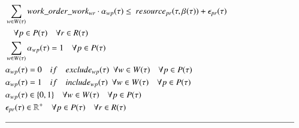 \begin{alignat}{2}
	& \sum_{\ElementWorkOrder \in \SetWorkOrder{}} \ParStrategicWorkOrderWeight \cdot \VarStrategicWorkOrderAssignment{\ElementWorkOrder}{\ElementPeriod} \leq \ \ParStrategicResource + \VarStrategicExcess  \notag\\
	& \quad \forall \ElementPeriod \in \SetPeriod \quad \forall \ElementResource \in \SetResource                                \label{eqn:strategic:constraint:resource}\\
	& \sum_{\ElementWorkOrder \in \SetWorkOrder{}} \VarStrategicWorkOrderAssignment{\ElementWorkOrder}{\ElementPeriod} = 1              \quad \forall \ElementPeriod \in \SetPeriod                                                                                                                                                                                                                               \label{eqn:constraint:strategic:schedule_once}\\
	& \VarStrategicWorkOrderAssignment{\ElementWorkOrder}{\ElementPeriod} = 0                                                            \quad if\quad \ParStrategicExclude \ \ \forall \ElementWorkOrder \in \SetWorkOrder{}\quad \forall \ElementPeriod \in \SetPeriod                                                                                                                                                                                              \label{eqn:constraint:strategic:include}\\
	& \VarStrategicWorkOrderAssignment{\ElementWorkOrder}{\ElementPeriod} = 1                                                            \quad if\quad \ParStrategicInclude \ \ \forall \ElementWorkOrder \in \SetWorkOrder{}\quad \forall \ElementPeriod \in \SetPeriod                                                                                                                                                                                              \label{eqn:strategic:constraint:exclude}\\
	& \VarStrategicWorkOrderAssignment{\ElementWorkOrder}{\ElementPeriod} \in \{0, 1\}                                                   \quad \forall \ElementWorkOrder \in \SetWorkOrder{} \quad \forall \ElementPeriod \in \SetPeriod                                                                                                                                                                           \label{eqn:variable:strategic:assignment}      \\ 
	& \VarStrategicExcess \in \mathbb{R}^{+}                                                                                             \quad \forall \ElementPeriod \in \SetPeriod \quad \forall \ElementResource \in \SetResource                                                                                                                                                                               \label{eqn:variable:strateigc:penalty}\\ 
	& \text{\rule{\linewidth}{0.4pt}} \notag
\end{alignat}
